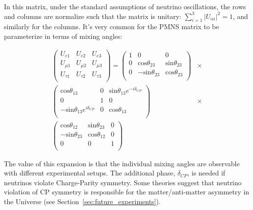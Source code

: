 In this matrix, under the standard assumptions of neutrino oscillations, the rows and columns are normalize such that the matrix is  unitary: $\sum_{i=1}^3 | U_{\alpha i} | ^2 = 1$, and similarly for the columns.  It's very common for the PMNS matrix to be parameterize in terms of mixing angles: 

\begin{align}
  \left(
  \begin{array}{ccc}
    U_{e1} & U_{e2} & U_{e3}  \\
    U_{\mu1} & U_{\mu2} & U_{\mu3}  \\
    U_{\tau1} & U_{\tau2} & U_{\tau3}  \\
  \end{array} 
  \right)
  = 
  \left(
  \begin{array}{ccc}
    1 & 0 & 0  \\
    0 & \text{cos}\theta_{23} & \text{sin}\theta_{23}  \\
    0 & -\text{sin}\theta_{23} & \text{cos}\theta_{23}  \\
  \end{array} 
  \right)
  &\times \\
  \left(
  \begin{array}{ccc}
     \text{cos}\theta_{13} & 0 & \text{sin}\theta_{13} e^{ - i \delta_{CP}}  \\
     0 & 1 & 0  \\
     -\text{sin}\theta_{13} e^{i \delta_{CP}} & 0 & \text{cos}\theta_{13}  \\
  \end{array} 
  \right)
  &\times \\
  \left(
  \begin{array}{ccc}
    \text{cos}\theta_{12} & \text{sin}\theta_{23} & 0  \\
    - \text{sin}\theta_{23} & \text{cos}\theta_{12} & 0 \\
    0 & 0 & 1  \\
  \end{array} 
  \right)
\end{align}

The value of this expansion is that the individual mixing angles are observable with different experimental setups.  The additional phase, $\delta_{CP}$, is needed if neutrinos violate Charge-Parity symmetry.  Some theories suggest that neutrino violation of CP symmetry is responsible for the matter/anti-matter asymmetry in the Universe (see Section~\ref{sec:future_experiments}).


